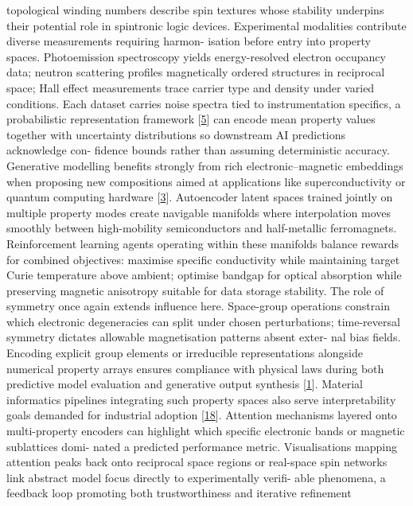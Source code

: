 \documentclass[
]{article}
\begin{document}
topological winding numbers describe spin textures whose stability
underpins their potential role in spintronic logic devices. Experimental
modalities contribute diverse measurements requiring harmon- isation
before entry into property spaces. Photoemission spectroscopy yields
energy-resolved electron occupancy data; neutron scattering profiles
magnetically ordered structures in reciprocal space; Hall effect
measurements trace carrier type and density under varied conditions.
Each dataset carries noise spectra tied to instrumentation specifics, a
probabilistic representation framework {[}\hyperref[_bookmark45]{5}{]}
can encode mean property values together with uncertainty distributions
so downstream AI predictions acknowledge con- fidence bounds rather than
assuming deterministic accuracy. Generative modelling benefits strongly
from rich electronic--magnetic embeddings when proposing new
compositions aimed at applications like superconductivity or quantum
computing hardware {[}\hyperref[_bookmark43]{3}{]}. Autoencoder latent
spaces trained jointly on multiple property modes create navigable
manifolds where interpolation moves smoothly between high-mobility
semiconductors and half-metallic ferromagnets. Reinforcement learning
agents operating within these manifolds balance rewards for combined
objectives: maximise specific conductivity while maintaining target
Curie temperature above ambient; optimise bandgap for optical absorption
while preserving magnetic anisotropy suitable for data storage
stability. The role of symmetry once again extends influence here.
Space-group operations constrain which electronic degeneracies can split
under chosen perturbations; time-reversal symmetry dictates allowable
magnetisation patterns absent exter- nal bias fields. Encoding explicit
group elements or irreducible representations alongside numerical
property arrays ensures compliance with physical laws during both
predictive model evaluation and generative output synthesis
{[}\hyperref[_bookmark41]{1}{]}. Material informatics pipelines
integrating such property spaces also serve interpretability goals
demanded for industrial adoption {[}\hyperref[_bookmark58]{18}{]}.
Attention mechanisms layered onto multi-property encoders can highlight
which specific electronic bands or magnetic sublattices domi- nated a
predicted performance metric. Visualisations mapping attention peaks
back onto reciprocal space regions or real-space spin networks link
abstract model focus directly to experimentally verifi- able phenomena,
a feedback loop promoting both trustworthiness and iterative refinement
\end{document}

